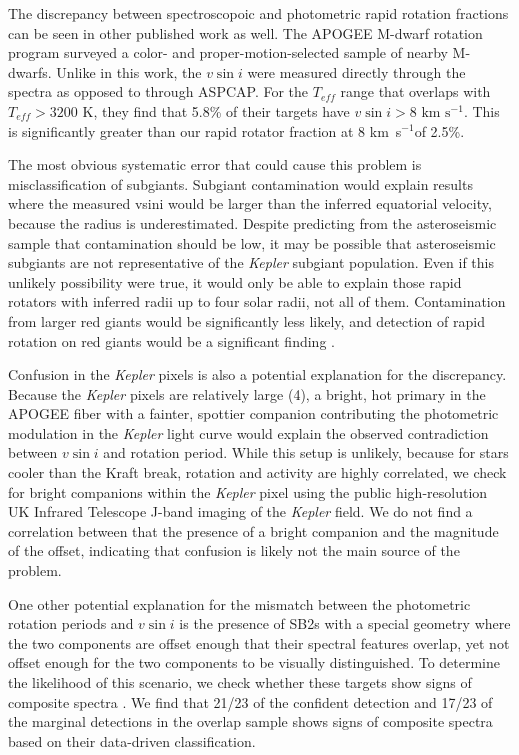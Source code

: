 \documentclass[manuscript]{aastex6}
\newcommand{\vsini}{\ensuremath{v \sin i}}
\newcommand{\Kepler}{\mbox{\textit{Kepler}}}
\newcommand{\Teff}{\ensuremath{T_{eff}}}
\newcommand{\kms}{\textrm{ km~s}\ensuremath{^{-1}}}
\begin{document}
The discrepancy between spectroscopoic and photometric rapid rotation fractions
can be seen in other published work as well. The APOGEE M-dwarf rotation
program \citep{Gilhool18} surveyed a color- and proper-motion-selected sample
of nearby M-dwarfs. Unlike in this work, the \vsini{} were measured directly
through the spectra as opposed to through ASPCAP\@. For the \Teff{} range that
overlaps with \citet{McQuillan14} \(\Teff > 3200\) K, they find that 5.8\% of
their targets have \(\vsini > 8 \kms\). This is significantly greater than our
rapid rotator fraction at 8 \kms of 2.5\%. 

The most obvious systematic error that could cause this problem is
misclassification of subgiants. Subgiant contamination would explain 
results where the measured vsini would be
larger than the inferred equatorial velocity, because the radius is
underestimated. Despite predicting from the asteroseismic sample that
contamination should be low, it may be possible that asteroseismic subgiants
are not representative of the \Kepler{} subgiant population. Even if this
unlikely possibility were true, it would only be able to explain those rapid
rotators with inferred radii up to four solar radii, not all of them.
Contamination from larger red giants would be significantly less likely, and
detection of rapid rotation on red giants would be a significant finding
\citep{Tayar15}.

Confusion in the \Kepler{} pixels is also a potential explanation for the
discrepancy. Because the \Kepler{} pixels are relatively large (4\arcsec), a 
bright, hot primary in the APOGEE fiber with a fainter, spottier companion 
contributing the photometric modulation in the
\Kepler{} light curve would explain the observed contradiction between
\vsini{} and rotation period. While this setup is unlikely, because for stars
cooler than the Kraft break, rotation and activity are highly correlated, 
we check for bright companions
within the \Kepler{} pixel using the public high-resolution UK Infrared Telescope
J-band imaging of the \Kepler{} field. We do not find a correlation between 
that the presence of a bright companion and the magnitude of the offset, 
indicating that confusion is likely not the main source of the problem.

One other potential explanation for the mismatch between the photometric
rotation periods and \vsini{} is the presence of SB2s with a special geometry
where the two components are offset enough that their spectral features
overlap, yet not offset enough for the two components to be visually
distinguished.  To determine the likelihood of this scenario, we check whether
these targets show signs of composite spectra \citep{ElBadry18}. We 
find that 21/23 of the confident detection and 17/23 of the marginal detections
in the overlap sample shows signs of composite spectra based on their
data-driven classification.
\end{document}
